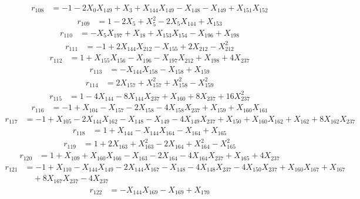 \begin{align*}
r_{108}&=-1-2X_{0}X_{149}+X_{3}+X_{144}X_{149}-X_{148}-X_{149}+X_{151}X_{152}
\end{align*}
\begin{align*}
r_{109}&=1-2X_{5}+X_{5}^{2}-2X_{5}X_{144}+X_{153}
\end{align*}
\begin{align*}
r_{110}&=-X_{5}X_{197}+X_{18}+X_{153}X_{154}-X_{196}+X_{198}
\end{align*}
\begin{align*}
r_{111}&=-1+2X_{144}X_{212}-X_{155}+2X_{212}-X_{212}^{2}
\end{align*}
\begin{align*}
r_{112}&=1+X_{155}X_{156}-X_{196}-X_{197}X_{212}+X_{198}+4X_{237}
\end{align*}
\begin{align*}
r_{113}&=-X_{144}X_{158}-X_{158}+X_{159}
\end{align*}
\begin{align*}
r_{114}&=2X_{157}+X_{157}^{2}+X_{158}^{2}-X_{159}^{2}
\end{align*}
\begin{align*}
r_{115}&=1-4X_{144}-8X_{144}X_{237}+X_{160}+8X_{237}+16X_{237}^{2}
\end{align*}
\begin{align*}
r_{116}&=-1+X_{104}-X_{157}-2X_{158}-4X_{158}X_{237}+X_{159}+X_{160}X_{161}
\end{align*}
\begin{align*}
r_{117}&=-1+X_{105}-2X_{144}X_{162}-X_{148}-X_{149}-4X_{149}X_{237}+X_{150}+X_{160}X_{162}+X_{162}+8X_{162}X_{237}
\end{align*}
\begin{align*}
r_{118}&=1+X_{144}-X_{144}X_{164}-X_{164}+X_{165}
\end{align*}
\begin{align*}
r_{119}&=1+2X_{163}+X_{163}^{2}-2X_{164}+X_{164}^{2}-X_{165}^{2}
\end{align*}
\begin{align*}
r_{120}&=1+X_{109}+X_{160}X_{166}-X_{163}-2X_{164}-4X_{164}X_{237}+X_{165}+4X_{237}
\end{align*}
\begin{align*}
r_{121}&=-1+X_{110}-X_{144}X_{149}-2X_{144}X_{167}-X_{148}-4X_{148}X_{237}-4X_{150}X_{237}+X_{160}X_{167}+X_{167}\\
&\quad +8X_{167}X_{237}-4X_{237}
\end{align*}
\begin{align*}
r_{122}&=-X_{144}X_{169}-X_{169}+X_{170}
\end{align*}
